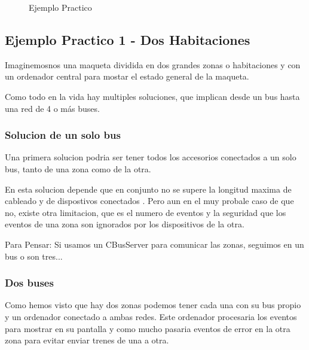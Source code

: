 \begin{figure}[H]
    \centering
    \caption{Ejemplo Practico}
    \label{fig:ejPractico}
\end{figure}

\subsection{Ejemplo Practico 1 - Dos Habitaciones}
Imaginemosnos una maqueta dividida en dos grandes zonas o habitaciones y con un ordenador central para  mostar el estado general de la maqueta. 

Como todo en la vida hay multiples soluciones, que implican desde un bus hasta una red de 4 o más buses.

\subsubsection{Solucion de un solo bus}
Una primera solucion podria ser tener todos los accesorios conectados a un solo bus, tanto de una zona como de la otra.

En esta solucion depende que en conjunto no se supere la longitud maxima de cableado y de dispostivos conectados .
Pero aun en el muy probale caso de que no, existe otra limitacion, que es el numero de eventos y la seguridad que los eventos de una zona son ignorados por los dispositivos de la otra.


\begin{mdframed}
Para Pensar: Si usamos un CBusServer para comunicar las zonas, seguimos en un bus o son tres... 
\end{mdframed}

\subsubsection{Dos buses}
Como hemos visto que hay dos zonas podemos tener cada una con su bus propio y un ordenador conectado a ambas redes. Este ordenador procesaria los eventos para mostrar en su pantalla y como mucho pasaria eventos de error en la otra zona para evitar enviar trenes de una a otra.

